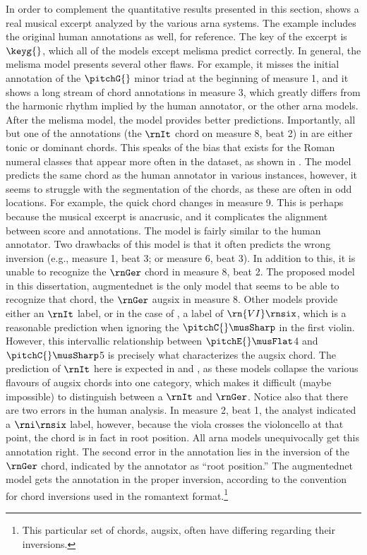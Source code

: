 In order to complement the quantitative results presented in
this section,  shows a real musical
excerpt analyzed by the various \gls{arna} systems. The
example includes the original human annotations as well, for
reference. The key of the excerpt is $\keyg{}$, which all of
the models except \gls{melisma} predict correctly. In
general, the \gls{melisma} model presents several other
flaws. For example, it misses the initial annotation of the
$\pitchG{}$ minor triad at the beginning of measure 1, and
it shows a long stream of chord annotations in measure 3,
which greatly differs from the harmonic rhythm implied by
the human annotator, or the other \gls{arna} models. After
the \gls{melisma} model, the \textcite{chen2021attend} model
provides better predictions. Importantly, all but one of the
annotations (the $\rnIt$ chord on measure 8, beat 2) in
\textcite{chen2021attend} are either tonic or dominant
chords. This speaks of the bias that exists for the Roman
numeral classes that appear more often in the dataset, as
shown in . The \textcite{micchi2021deep}
model predicts the same chord as the human annotator in
various instances, however, it seems to struggle with the
segmentation of the chords, as these are often in odd
locations. For example, the quick chord changes in measure
9. This is perhaps because the musical excerpt is anacrusic,
and it complicates the alignment between score and
annotations. The \textcite{mcleod2021modular} model is
fairly similar to the human annotator. Two drawbacks of this
model is that it often predicts the wrong inversion (e.g.,
measure 1, beat 3; or measure 6, beat 3). In addition to
this, it is unable to recognize the $\rnGer$ chord in
measure 8, beat 2. The proposed model in this dissertation,
\gls{augmentednet} is the only model that seems to be able
to recognize that chord, the $\rnGer$ \gls{augsix} in
measure 8. Other models provide either an $\rnIt$ label, or
in the case of \textcite{mcleod2021modular}, a label of
$\rn{VI}\rnsix$, which is a reasonable prediction when
ignoring the $\pitchC{}\musSharp$ in the first violin.
However, this intervallic relationship between
$\pitchE{}\musFlat$4 and $\pitchC{}\musSharp$5 is precisely
what characterizes the \gls{augsix} chord. The prediction of
$\rnIt$ here is expected in \textcite{chen2021attend} and
\textcite{micchi2021deep}, as these models collapse the
various flavours of \gls{augsix} chords into one category,
which makes it difficult (maybe impossible) to distinguish
between a $\rnIt$ and $\rnGer$. Notice also that there are
two errors in the human analysis. In measure 2, beat 1, the
analyst indicated a $\rni\rnsix$ label, however, because the
viola crosses the violoncello at that point, the chord is in
fact in root position. All \gls{arna} models unequivocally
get this annotation right. The second error in the
annotation lies in the inversion of the $\rnGer$ chord,
indicated by the annotator as ``root position.'' The
\gls{augmentednet} model gets the annotation in the proper
inversion, according to the convention for chord inversions
used in the \gls{romantext} format.\footnote{This particular
set of chords, \gls{augsix}, often have differing regarding
their inversions.}

